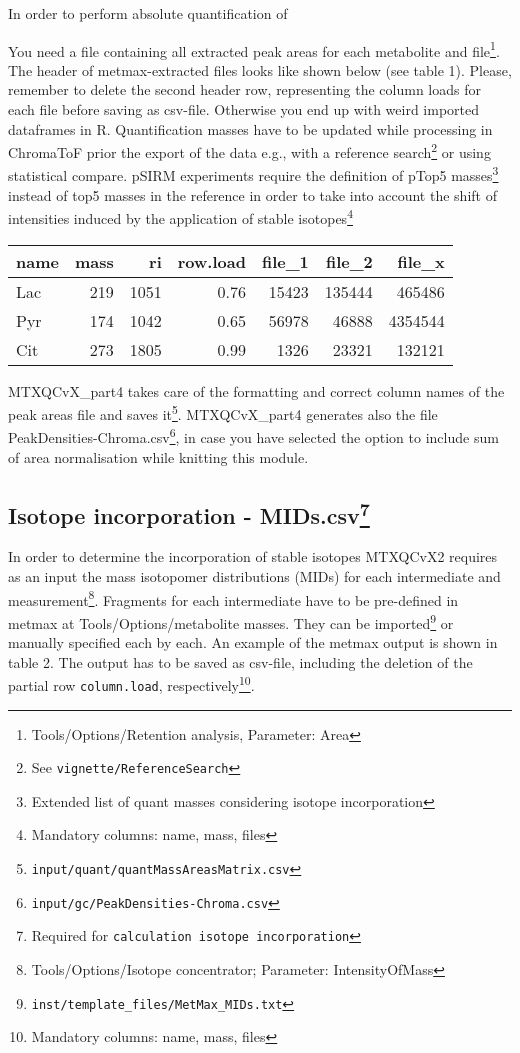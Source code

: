 \documentclass[]{book}
\let\rmarkdownfootnote\footnote%
\def\footnote{\protect\rmarkdownfootnote}
\theoremstyle{definition}
\theoremstyle{definition}
\theoremstyle{definition}
\theoremstyle{remark}
\begin{document}
In order to perform absolute quantification of

You need a file containing all extracted peak areas for each metabolite
and file\footnote{Tools/Options/Retention analysis, Parameter: Area}.
The header of metmax-extracted files looks like shown below (see table
1). Please, remember to delete the second header row, representing the
column loads for each file before saving as csv-file. Otherwise you end
up with weird imported dataframes in R. Quantification masses have to be
updated while processing in ChromaToF prior the export of the data e.g.,
with a reference search\footnote{See \texttt{vignette/ReferenceSearch}}
or using statistical compare. pSIRM experiments require the definition
of pTop5 masses\footnote{Extended list of quant masses considering
  isotope incorporation} instead of top5 masses in the reference in
order to take into account the shift of intensities induced by the
application of stable isotopes\footnote{Mandatory columns: name, mass,
  files}

\begin{tabular}{l|r|r|r|r|r|r}
\hline
name & mass & ri & row.load & file\_1 & file\_2 & file\_x\\
\hline
Lac & 219 & 1051 & 0.76 & 15423 & 135444 & 465486\\
\hline
Pyr & 174 & 1042 & 0.65 & 56978 & 46888 & 4354544\\
\hline
Cit & 273 & 1805 & 0.99 & 1326 & 23321 & 132121\\
\hline
\end{tabular}

MTXQCvX\_part4 takes care of the formatting and correct column names of
the peak areas file and saves it\footnote{\texttt{input/quant/quantMassAreasMatrix.csv}}.
MTXQCvX\_part4 generates also the file
PeakDensities-Chroma.csv\footnote{\texttt{input/gc/PeakDensities-Chroma.csv}},
in case you have selected the option to include sum of area
normalisation while knitting this module.

\subsection[Isotope incorporation - MIDs.csv]{\texorpdfstring{Isotope
incorporation - MIDs.csv\footnote{Required for
  \texttt{calculation\ isotope\ incorporation}}}{Isotope incorporation - MIDs.csv}}\label{isotope-incorporation---mids.csv}

In order to determine the incorporation of stable isotopes MTXQCvX2
requires as an input the mass isotopomer distributions (MIDs) for each
intermediate and measurement\footnote{Tools/Options/Isotope
  concentrator; Parameter: IntensityOfMass}. Fragments for each
intermediate have to be pre-defined in metmax at
Tools/Options/metabolite masses. They can be imported\footnote{\texttt{inst/template\_files/MetMax\_MIDs.txt}}
or manually specified each by each. An example of the metmax output is
shown in table 2. The output has to be saved as csv-file, including the
deletion of the partial row \texttt{column.load}, respectively\footnote{Mandatory
  columns: name, mass, files}.
\end{document}
